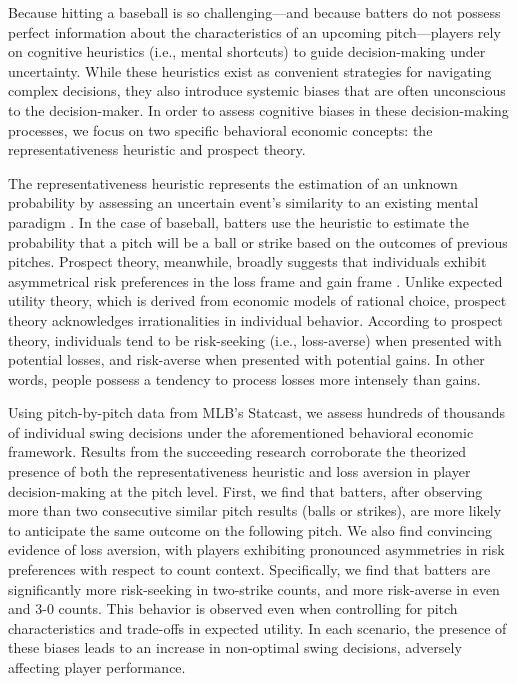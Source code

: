 \documentclass[12pt]{article}
\numberwithin{equation}{section}
\begin{document}
\vspace{5mm} %

Because hitting a baseball is so challenging---and because batters do not possess perfect information about the characteristics of an upcoming pitch---players rely on cognitive heuristics (i.e., mental shortcuts) to guide decision-making under uncertainty. While these heuristics exist as convenient strategies for navigating complex decisions, they also introduce systemic biases that are often unconscious to the decision-maker. In order to assess cognitive biases in these decision-making processes, we focus on two specific behavioral economic concepts: the representativeness heuristic and prospect theory.

\vspace{5mm} %

The representativeness heuristic represents the estimation of an unknown probability by assessing an uncertain event’s similarity to an existing mental paradigm \parencite{kahneman_psychology_1973}. In the case of baseball, batters use the heuristic to estimate the probability that a pitch will be a ball or strike based on the outcomes of previous pitches. Prospect theory, meanwhile, broadly suggests that individuals exhibit asymmetrical risk preferences in the loss frame and gain frame \parencite{kahneman_prospect_1979}. Unlike expected utility theory, which is derived from economic models of rational choice, prospect theory acknowledges irrationalities in individual behavior. According to prospect theory, individuals tend to be risk-seeking (i.e., loss-averse) when presented with potential losses, and risk-averse when presented with potential gains. In other words, people possess a tendency to process losses more intensely than gains.

\vspace{5mm} %

Using pitch-by-pitch data from MLB’s Statcast, we assess hundreds of thousands of individual swing decisions under the aforementioned behavioral economic framework. Results from the succeeding research corroborate the theorized presence of both the representativeness heuristic and loss aversion in player decision-making at the pitch level.  First, we find that batters, after observing more than two consecutive similar pitch results (balls or strikes), are more likely to anticipate the same outcome on the following pitch. We also find convincing evidence of loss aversion, with players exhibiting pronounced asymmetries in risk preferences with respect to count context. Specifically, we find that batters are significantly more risk-seeking in two-strike counts, and more risk-averse in even and 3-0 counts. This behavior is observed even when controlling for pitch characteristics and trade-offs in expected utility. In each scenario, the presence of these biases leads to an increase in non-optimal swing decisions, adversely affecting player performance.
\end{document}
